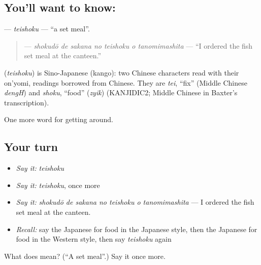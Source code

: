 \subsection*{You'll want to know: }
\textbf{} — \emph{teishoku} — \textquotedblleft{}a set meal\textquotedblright{}.

\begin{quote}
\textbf{   } — \emph{shokudō de sakana no teishoku o tanomimashita} — \textquotedblleft{}I ordered the fish set meal at the canteen.\textquotedblright{}
\end{quote}

\begin{cousinweb}
\textbf{} (\emph{teishoku}) is Sino-Japanese (kango): two Chinese characters read with their on'yomi, readings borrowed from Chinese. They are \emph{tei}, \textquotedblleft{}fix\textquotedblright{} (Middle Chinese \emph{dengH}) and \emph{shoku}, \textquotedblleft{}food\textquotedblright{} (\emph{zyik}) (KANJIDIC2; Middle Chinese in Baxter's transcription).
\end{cousinweb}

\begin{grammarlens}[title={What you've built}]
One more word for getting around.
\end{grammarlens}

\subsection*{Your turn}
\begin{itemize}
\raggedright
  \item \emph{Say it:} \emph{teishoku}
  \item \emph{Say it:} \emph{teishoku}, once more
  \item \emph{Say it:} \emph{shokudō de sakana no teishoku o tanomimashita} — I ordered the fish set meal at the canteen.
  \item \emph{Recall:} say the Japanese for food in the Japanese style, then the Japanese for food in the Western style, then say \emph{teishoku} again
\end{itemize}

\begin{tcolorbox}[breakable,colback=teal!4,colframe=teal!35!black,title={Before you move on}]
What does  mean? (\textquotedblleft{}A set meal\textquotedblright{}.) Say it once more.
\end{tcolorbox}
